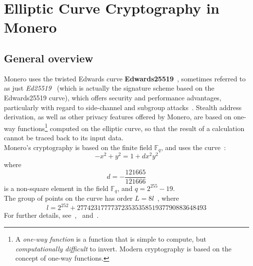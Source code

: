 \documentclass[conference]{IEEEtran}
\begin{document}
\section{Elliptic Curve Cryptography in Monero}\label{app:ecc}
\subsection{General overview}\label{app:ecc_overview}
Monero uses the twisted Edwards curve \textbf{Edwards25519}~\cite{monero_ed25519}, sometimes referred to as just \textit{Ed25519}~\cite{zero_to_monero_2} (which is actually the signature scheme based on the Edwards25519 curve), which offers security and performance advantages, particularly with regard to side-channel and subgroup attacks~\cite{ed25519_security}. Stealth address derivation, as well as other privacy features offered by Monero, are based on one-way functions\footnote{A \textit{one-way function} is a function that is simple to compute, but \textit{computationally difficult} to invert. Modern cryptography is based on the concept of one-way functions.} computed on the elliptic curve, so that the result of a calculation cannot be traced back to its input data.\\
Monero's cryptography is based on the finite field $\mathbb{F}_q$, and uses the curve~\cite{cryptonote}:
\[
-x^2 + y^2 = 1 + dx^2y^2
\]
where
\[
d = -\frac{121665}{121666}
\]
is a non-square element in the field $\mathbb{F}_q$, and $q = 2^{255} - 19$.\\
The group of points on the curve has order $L = 8l$~\cite{elliptic_curves}, where
\[
l = 2^{252} + 27742317777372353535851937790883648493
\]
For further details, see~\cite{cryptonote},~\cite{monero_ed25519} and~\cite{zero_to_monero_2}.
\end{document}
